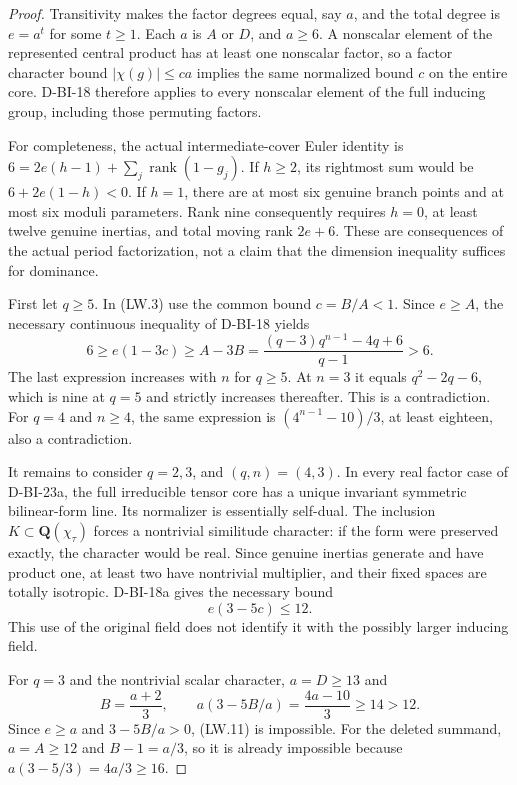 \begin{proof}
Transitivity makes the factor degrees equal, say $a$, and the total
degree is $e=a^t$ for some $t\ge1$. Each $a$ is $A$ or $D$, and
$a\ge6$. A nonscalar element of the represented central product
has at least one nonscalar factor, so a factor character bound
$|\chi(g)|\le ca$ implies the same normalized bound $c$ on the
entire core. D-BI-18 therefore applies to every nonscalar element
of the full inducing group, including those permuting factors.

For completeness, the actual intermediate-cover Euler identity is
$6=2e(h-1)+\sum_j\operatorname{rank}(1-g_j)$. If $h\ge2$, its
rightmost sum would be $6+2e(1-h)<0$. If $h=1$, there are at most
six genuine branch points and at most six moduli parameters.
Rank nine consequently requires $h=0$, at least twelve genuine
inertias, and total moving rank $2e+6$. These are consequences of
the actual period factorization, not a claim that the dimension
inequality suffices for dominance.

First let $q\ge5$. In (LW.3) use the common bound
$c=B/A<1$. Since $e\ge A$, the necessary continuous inequality
of D-BI-18 yields
\[
 6\ge e(1-3c)\ge A-3B
       =\frac{(q-3)q^{n-1}-4q+6}{q-1}>6.                   \tag{LW.10}
\]
The last expression increases with $n$ for $q\ge5$. At $n=3$
it equals $q^2-2q-6$, which is nine at $q=5$ and strictly
increases thereafter. This is a contradiction.
For $q=4$ and $n\ge4$, the same expression is
$(4^{n-1}-10)/3$, at least eighteen, also a contradiction.

It remains to consider $q=2,3$, and $(q,n)=(4,3)$.
In every real factor case of D-BI-23a, the full irreducible tensor
core has a unique invariant symmetric bilinear-form line. Its
normalizer is essentially self-dual. The inclusion
$K\subset\mathbf Q(\chi_\tau)$ forces a nontrivial similitude
character: if the form were preserved exactly, the character would
be real. Since genuine inertias generate and have product one,
at least two have nontrivial multiplier, and their fixed spaces
are totally isotropic. D-BI-18a gives the necessary bound
\[
                         e(3-5c)\le12.                     \tag{LW.11}
\]
This use of the original field does not identify it with the
possibly larger inducing field.

For $q=3$ and the nontrivial scalar character, $a=D\ge13$ and
\[
 B=\frac{a+2}{3},\qquad
 a(3-5B/a)=\frac{4a-10}{3}\ge14>12.
\]
Since $e\ge a$ and $3-5B/a>0$, (LW.11) is impossible.
For the deleted summand, $a=A\ge12$ and $B-1=a/3$, so it is
already impossible because $a(3-5/3)=4a/3\ge16$.


\end{proof}
